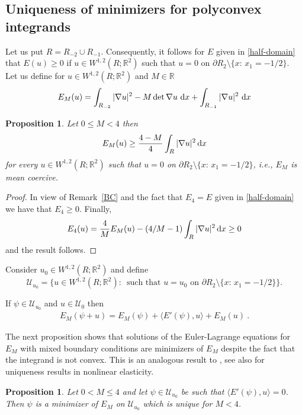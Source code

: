 \documentclass[12pt]{amsart}
\newcommand{\md}{{\rm d}}
\newcommand{\dx}{\, \md x}
\newcommand{\R}{\mathbb{R}}
\newcommand{\1}{{\bf 1}}
\newtheorem{proposition}[definition]{Proposition}
\begin{document}
\subsection{Uniqueness of minimizers for polyconvex integrands}
    Let us put $R=R_{-2}\cup R_{-1}$. Consequently,  it follows for $E$ given in \eqref{half-domain} that  $E(u)\ge 0$ if $u\in W^{1,2}(R;\R^2)$  such that $u=0$  on $\partial R_2\setminus\{x:\, x_1=-1/2\}$.
Let us define for $u\in W^{1,2}(R;\R^2)$ and $M\in\R$
\begin{align}\label{EM}
    E_M(u)= \int_{R_{-2}} |\nabla u|^2 -M \det\nabla u\,\dx +\int_{R_{-1}}|\nabla u |^2\,\dx \end{align}


\begin{proposition}\label{first-order}
    Let $0\le M<4$ then 
    $$E_M(u)\ge \frac{4-M}{4}\int_{R} |\nabla u|^2\,\md x$$ for every $u\in W^{1,2}(R;\R^2)$  such that $u=0$  on $\partial R_2\setminus\{x:\, x_1=-1/2\}$, i.e., $E_M$ is mean coercive. 
    \end{proposition}

    \begin{proof}
        In view of Remark~\ref{BC} and the fact that $E_4=E$ given in \eqref{half-domain} we have that $E_4\ge 0$. 
        Finally, 
        $$E_4(u)=\frac4M E_M(u)-(4/M-1)\int_{R} |\nabla u|^2\,\md x\ge 0 $$
        and the result follows.
    \end{proof}

Consider $u_0\in W^{1,2}(R;\R^2)$ and define 
$$\mathcal{U}_{u_0} =\{u\in W^{1,2}(R;\R^2):\,  \textrm{ such that } u=u_0  \textrm{ on } \partial R_2\setminus\{x:\, x_1=-1/2\} \}. $$

If $\psi\in \mathcal{U}_{u_0}$ and $u\in \mathcal{U}_0$ then 
\begin{align}\label{minimizer}
E_M(\psi+ u)=E_M(\psi)+\langle E'(\psi),u\rangle +E_M(u)\ .
\end{align}

The next proposition shows that solutions of the Euler-Lagrange equations for $E_M$  with mixed boundary conditions are minimizers of $E_M$ despite the fact that the integrand is not convex.  This is an analogous result to \cite{neff}, see also \cite{john,spector,spector2} for uniqueness results in nonlinear elasticity. 

\begin{proposition}
    Let $0<M\le 4$ and let  $\psi\in\mathcal{U}_{u_0}$ be such that  $\langle E'(\psi),u\rangle=0$. Then $\psi$ is a minimizer 
    of $E_M$ on $\mathcal{U}_{u_0}$  which is unique for $M<4$.
\end{proposition}
\end{document}
